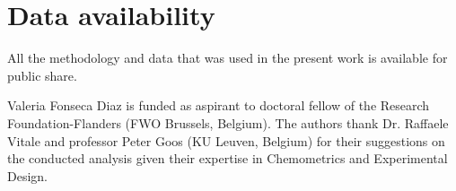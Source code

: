 \documentclass[journal=ancham,manuscript=article]{achemso}
\begin{document}
\section{Data availability}

All the methodology and data that was used in the present work is available for public share. 


\begin{acknowledgement}

Valeria Fonseca Diaz is funded as aspirant to doctoral fellow of
the Research Foundation-Flanders (FWO Brussels, Belgium).
The authors thank Dr. Raffaele Vitale and professor Peter Goos (KU Leuven, Belgium) for their suggestions on the conducted analysis given their expertise in Chemometrics and Experimental Design. 
\end{acknowledgement}





\end{document}
